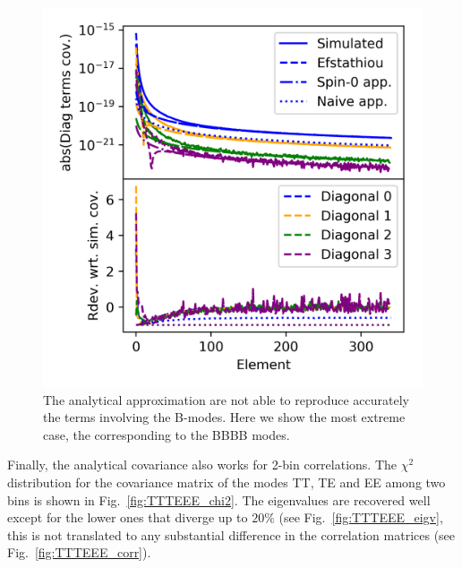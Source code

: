 \documentclass[a4paper,11pt]{article}
\begin{document}
\begin{figure} %
  \centering
  \includegraphics[width=\columnwidth]{./figures/run_sph_ALL_BBBB_check_diagonal_terms_4.png}
  \caption{The analytical approximation are not able to reproduce accurately
    the terms involving the B-modes. Here we show the most extreme case, the
    corresponding to the BBBB modes.}
  \label{fig:BBBB}
\end{figure}

Finally, the analytical covariance also works for 2-bin correlations. The
$\chi^2$ distribution for the covariance matrix of the modes TT, TE and EE
among two bins is shown in Fig.~\ref{fig:TTTEEE_chi2}. The eigenvalues
are recovered well except for the lower ones that diverge up to $20\%$ (see
Fig.~\ref{fig:TTTEEE_eigv}, this is not translated to any substantial
difference in the correlation matrices (see Fig.~\ref{fig:TTTEEE_corr}).
\end{document}
